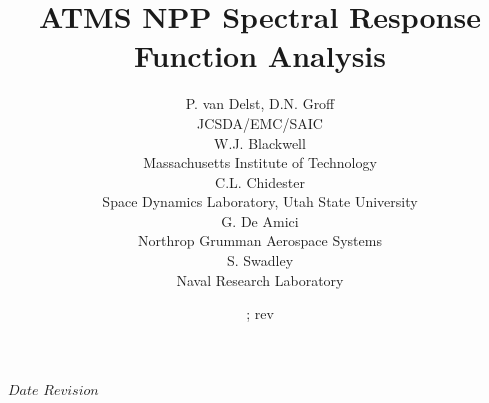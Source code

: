 



\SVN $Date$
\SVN $Revision$

\newcommand{\frequency}[1]{\ensuremath{f_{#1}}}
\newcommand{\bfrequency}[1]{\boldmath\frequency{#1}\unboldmath}
\newcommand{\bdf}[1]{\boldmath\df{#1}\unboldmath}
\newcommand{\sideband}[1]{\ensuremath{df_{#1}}}
\newcommand{\bsideband}[1]{\boldmath\sideband{#1}\unboldmath}
\newcommand{\bdeltaf}{\boldmath\ensuremath{\Delta f}\unboldmath}
\newcommand{\up}[1]{\superscript{#1}}

\title{ATMS NPP Spectral Response Function Analysis}
\author{P. van Delst,
        D.N. Groff\\JCSDA/EMC/SAIC\\[0.25in]
        W.J. Blackwell\\Massachusetts Institute of Technology\\[0.25in]
        C.L. Chidester\\Space Dynamics Laboratory, Utah State University\\[0.25in]
        G. De Amici\\Northrop Grumman Aerospace Systems\\[0.25in]
        S. Swadley\\Naval Research Laboratory}
\date{\SVNDate ; rev\SVNRevision}
\docnumber{ }



\maketitle

\draftwatermark

